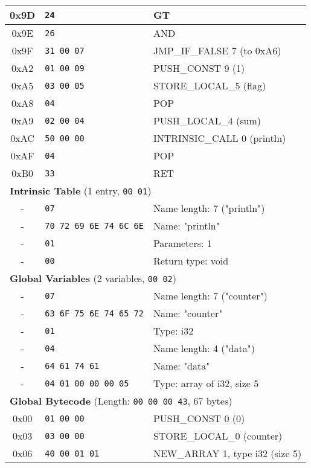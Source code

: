 \documentclass[a4paper,12pt]{article}
\begin{document}
\begin{longtable}{|c|l|p{6cm}|}
    0x9D & \texttt{24} & GT \\ \hline
    0x9E & \texttt{26} & AND \\ \hline
    0x9F & \texttt{31 00 07} & JMP\_IF\_FALSE 7 (to 0xA6) \\ \hline
    0xA2 & \texttt{01 00 09} & PUSH\_CONST 9 (1) \\ \hline
    0xA5 & \texttt{03 00 05} & STORE\_LOCAL\_$5$ (flag) \\ \hline
    0xA8 & \texttt{04} & POP \\ \hline
    0xA9 & \texttt{02 00 04} & PUSH\_LOCAL\_$4$ (sum) \\ \hline
    0xAC & \texttt{50 00 00} & INTRINSIC\_CALL 0 (println) \\ \hline
    0xAF & \texttt{04} & POP \\ \hline
    0xB0 & \texttt{33} & RET \\ \hline
    \multicolumn{3}{|l|}{\textbf{Intrinsic Table} (1 entry, \texttt{00 01})} \\ \hline
    - & \texttt{07} & Name length: 7 ("println") \\ \hline
    - & \texttt{70 72 69 6E 74 6C 6E} & Name: "println" \\ \hline
    - & \texttt{01} & Parameters: 1 \\ \hline
    - & \texttt{00} & Return type: void \\ \hline
    \multicolumn{3}{|l|}{\textbf{Global Variables} (2 variables, \texttt{00 02})} \\ \hline
    - & \texttt{07} & Name length: 7 ("counter") \\ \hline
    - & \texttt{63 6F 75 6E 74 65 72} & Name: "counter" \\ \hline
    - & \texttt{01} & Type: i32 \\ \hline
    - & \texttt{04} & Name length: 4 ("data") \\ \hline
    - & \texttt{64 61 74 61} & Name: "data" \\ \hline
    - & \texttt{04 01 00 00 00 05} & Type: array of i32, size 5 \\ \hline
    \multicolumn{3}{|l|}{\textbf{Global Bytecode} (Length: \texttt{00 00 00 43}, 67 bytes)} \\ \hline
    0x00 & \texttt{01 00 00} & PUSH\_CONST 0 (0) \\ \hline
    0x03 & \texttt{03 00 00} & STORE\_LOCAL\_$0$ (counter) \\ \hline
    0x06 & \texttt{40 00 01 01} & NEW\_ARRAY 1, type i32 (size 5) \\ \hline

\end{longtable}
\end{document}
